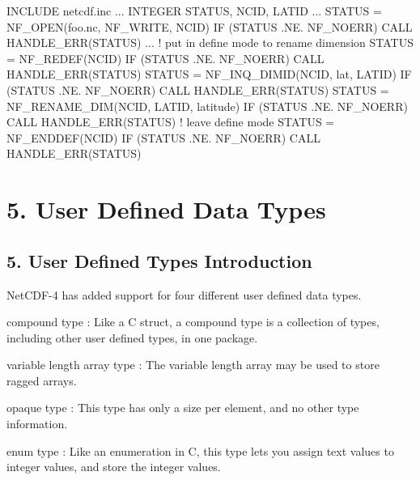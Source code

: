 I\+N\+C\+L\+U\+DE \textquotesingle{}netcdf.\+inc\textquotesingle{} ... I\+N\+T\+E\+G\+ER S\+T\+A\+T\+US, N\+C\+ID, L\+A\+T\+ID ... S\+T\+A\+T\+US = N\+F\+\_\+\+O\+P\+EN(\textquotesingle{}foo.\+nc\textquotesingle{}, N\+F\+\_\+\+W\+R\+I\+TE, N\+C\+ID) IF (S\+T\+A\+T\+US .NE. N\+F\+\_\+\+N\+O\+E\+RR) C\+A\+LL H\+A\+N\+D\+L\+E\+\_\+\+E\+R\+R(\+S\+T\+A\+T\+U\+S) ... ! put in define mode to rename dimension S\+T\+A\+T\+US = N\+F\+\_\+\+R\+E\+D\+E\+F(\+N\+C\+I\+D) IF (S\+T\+A\+T\+US .NE. N\+F\+\_\+\+N\+O\+E\+RR) C\+A\+LL H\+A\+N\+D\+L\+E\+\_\+\+E\+R\+R(\+S\+T\+A\+T\+U\+S) S\+T\+A\+T\+US = N\+F\+\_\+\+I\+N\+Q\+\_\+\+D\+I\+M\+ID(N\+C\+ID, \textquotesingle{}lat\textquotesingle{}, L\+A\+T\+ID) IF (S\+T\+A\+T\+US .NE. N\+F\+\_\+\+N\+O\+E\+RR) C\+A\+LL H\+A\+N\+D\+L\+E\+\_\+\+E\+R\+R(\+S\+T\+A\+T\+U\+S) S\+T\+A\+T\+US = N\+F\+\_\+\+R\+E\+N\+A\+M\+E\+\_\+\+D\+IM(N\+C\+ID, L\+A\+T\+ID, \textquotesingle{}latitude\textquotesingle{}) IF (S\+T\+A\+T\+US .NE. N\+F\+\_\+\+N\+O\+E\+RR) C\+A\+LL H\+A\+N\+D\+L\+E\+\_\+\+E\+R\+R(\+S\+T\+A\+T\+U\+S) ! leave define mode S\+T\+A\+T\+US = N\+F\+\_\+\+E\+N\+D\+D\+E\+F(\+N\+C\+I\+D) IF (S\+T\+A\+T\+US .NE. N\+F\+\_\+\+N\+O\+E\+RR) C\+A\+LL H\+A\+N\+D\+L\+E\+\_\+\+E\+R\+R(\+S\+T\+A\+T\+U\+S)\hypertarget{nc_f77_interface_guide_f77_User-Defined-Data-Types}{}\section{5. User Defined Data Types }\label{nc_f77_interface_guide_f77_User-Defined-Data-Types}
\hypertarget{nc_f77_interface_guide_f77_User-Defined-Types-Introduction}{}\subsection{5. User Defined Types Introduction }\label{nc_f77_interface_guide_f77_User-Defined-Types-Introduction}
Net\+C\+D\+F-\/4 has added support for four different user defined data types.

{\ttfamily compound type} \+: Like a C struct, a compound type is a collection of types, including other user defined types, in one package.

{\ttfamily variable length array type} \+: The variable length array may be used to store ragged arrays.

{\ttfamily opaque type} \+: This type has only a size per element, and no other type information.

{\ttfamily enum type} \+: Like an enumeration in C, this type lets you assign text values to integer values, and store the integer values.

